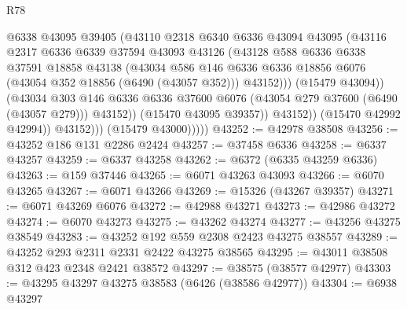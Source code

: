 \begin{lexlean}{R78}
\begin{coremodule}
                            @6338
                            @43095
                            @39405
                            (@43110
                              @2318
                              @6340
                              @6336
                              @43094
                              @43095
                              (@43116
                                @2317
                                @6336
                                @6339
                                @37594
                                @43093
                                @43126
                                (@43128
                                  @588
                                  @6336
                                  @6338
                                  @37591
                                  @18858
                                  @43138
                                  (@43034
                                    @586
                                    @146
                                    @6336
                                    @6336
                                    @18856
                                    @6076
                                    (@43054 @352 @18856 (@6490 (@43057 @352)))
                                    @43152)))
                              (@15479 @43094))
                            (@43034
                              @303
                              @146
                              @6336
                              @6336
                              @37600
                              @6076
                              (@43054 @279 @37600 (@6490 (@43057 @279)))
                              @43152))
                          (@15470 @43095 @39357))
                        @43152))
                    (@15470 @42992 @42994))
                  @43152)))
            (@15479 @43000)))))
@43252 := @42978 @38508
@43256 := @43252 @186 @131 @2286 @2424
@43257 := @37458 @6336
@43258 := @6337 @43257
@43259 := @6337 @43258
@43262 := @6372 (@6335 @43259 @6336)
@43263 := @159 @37446
@43265 := @6071 @43263 @43093
@43266 := @6070 @43265
@43267 := @6071 @43266
@43269 := @15326 (@43267 @39357)
@43271 := @6071 @43269 @6076
@43272 := @42988 @43271
@43273 := @42986 @43272
@43274 := @6070 @43273
@43275 := @43262 @43274
@43277 := @43256 @43275 @38549
@43283 := @43252 @192 @559 @2308 @2423 @43275 @38557
@43289 := @43252 @293 @2311 @2331 @2422 @43275 @38565
@43295 := @43011 @38508 @312 @423 @2348 @2421 @38572
@43297 := @38575 (@38577 @42977)
@43303 := @43295 @43297 @43275 @38583 (@6426 (@38586 @42977))
@43304 := @6938 @43297

\end{coremodule}
\end{lexlean}
